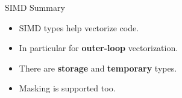 \begin{frame}[fragile]{SIMD Summary}
	\begin{itemize}
		\item{SIMD types help vectorize code.}
		\item{In particular for \textbf{outer-loop} vectorization.}
		\item{There are \textbf{storage} and \textbf{temporary} types.}
		\item{Masking is supported too.}
	\end{itemize}
\end{frame}

